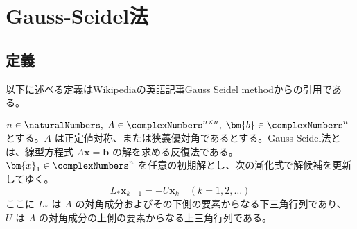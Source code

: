 \chapter{Gauss-Seidel法}
    \section{定義}
        以下に述べる定義はWikipediaの英語記事\href{https://en.wikipedia.org/wiki/Gauss%E2%80%93Seidel_method}{Gauss Seidel method}からの引用である。
        \par
        $n\in\naturalNumbers,\;A\in\complexNumbers^{n\times n},\;\bm{b}\in\complexNumbers^n$ とする。$A$ は正定値対称、または狭義優対角であるとする。Gauss-Seidel法とは、線型方程式 $A\bm{x}=\bm{b}$ の解を求める反復法である。$\bm{x}_1\in\complexNumbers^n$ を任意の初期解とし、次の漸化式で解候補を更新してゆく。
        \[ L_* \bm{x}_{k+1} = -U\bm{x}_k \quad (k=1,2,\dots)\]
        ここに $L_*$ は $A$ の対角成分およびその下側の要素からなる下三角行列であり、 $U$ は $A$ の対角成分の上側の要素からなる上三角行列である。
